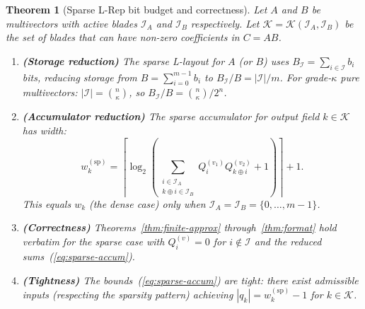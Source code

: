 \documentclass[11pt,a4paper]{article}
\theoremstyle{definition}
\theoremstyle{plain}
\newtheorem{theorem}{Theorem}[section]
\theoremstyle{remark}
\begin{document}
\begin{theorem}[Sparse L-Rep bit budget and correctness]
\label{thm:sparse}
Let $A$ and $B$ be multivectors with active blades $\mathcal{I}_A$
and $\mathcal{I}_B$ respectively.
Let $\mathcal{K} = \mathcal{K}(\mathcal{I}_A, \mathcal{I}_B)$ be the
set of blades that can have non-zero coefficients in $C = AB$.

\begin{enumerate}
  \item \textbf{(Storage reduction)} The sparse L-layout for $A$ (or $B$)
        uses $B_{\mathcal{I}} = \sum_{i \in \mathcal{I}} b_i$ bits,
        reducing storage from $B = \sum_{i=0}^{m-1} b_i$ to
        $B_{\mathcal{I}} / B = |\mathcal{I}|/m$.
        For grade-$\kappa$ pure multivectors:
        $|\mathcal{I}| = \binom{n}{\kappa}$, so
        $B_{\mathcal{I}} / B = \binom{n}{\kappa} / 2^n$.

  \item \textbf{(Accumulator reduction)} The sparse accumulator for
        output field $k \in \mathcal{K}$ has width:
        \begin{equation}\label{eq:sparse-accum}
          w_k^{(\mathrm{sp})} =
            \left\lceil\log_2\!\left(
              \sum_{\substack{i \in \mathcal{I}_A \\ k\oplus i \in \mathcal{I}_B}}
              Q_i^{(v_1)} Q_{k\oplus i}^{(v_2)} + 1
            \right)\right\rceil + 1.
        \end{equation}
        This equals $w_k$ (the dense case) only when
        $\mathcal{I}_A = \mathcal{I}_B = \{0,\ldots,m-1\}$.

  \item \textbf{(Correctness)} Theorems~\ref{thm:finite-approx}
        through~\ref{thm:format} hold verbatim for the sparse case
        with $Q_i^{(v)} = 0$ for $i \notin \mathcal{I}$ and the
        reduced sums~(\ref{eq:sparse-accum}).

  \item \textbf{(Tightness)} The bounds~(\ref{eq:sparse-accum}) are
        tight: there exist admissible inputs (respecting the sparsity
        pattern) achieving $|q_k| = w_k^{(\mathrm{sp})} - 1$ for
        $k \in \mathcal{K}$.
\end{enumerate}
\end{theorem}
\end{document}
